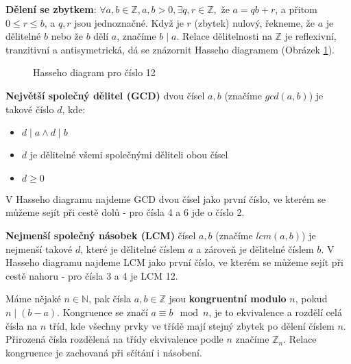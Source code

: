 \documentclass[10pt,a4paper]{article}
\begin{document}
\textbf{Dělení se zbytkem}: $\forall a, b \in \mathbb{Z}, a, b > 0, \exists q, r
\in \mathbb{Z},$ že $ a = qb + r$, a přitom $0 \leq r \le b$, a $q, r$ jsou
jednoznačné. Když je $r$ (zbytek) nulový, řekneme, že $a$ je dělitelné $b$ nebo
že $b$ dělí $a$, značíme $b \mid a$. Relace dělitelnosti na $\mathbb{Z}$ je
reflexivní, tranzitivní a antisymetrická, dá se znázornit Hasseho diagramem
(Obrázek \ref{fig:hasse}).

\begin{figure}[ht!]
\label{fig:hasse}
\centering
{}
\caption{Hasseho diagram pro číslo 12}
\end{figure}

\textbf{Největší společný dělitel (GCD)} dvou čísel $a, b$ (značíme $gcd(a,b)$)
je takové číslo $d$, kde:
\begin{itemize}
\item $d \mid a \wedge d \mid b$
\item $d$ je dělitelné všemi společnými děliteli obou čísel
\item $d \geq 0$
\end{itemize}
V Hasseho diagramu najdeme GCD dvou čísel jako první číslo, ve kterém se můžeme
sejít při cestě dolů - pro čísla 4 a 6 jde o číslo 2.

\textbf{Nejmenší společný násobek (LCM)} čísel $a, b$ (značíme $lcm(a, b)$) je
nejmenší takové $d$, které je dělitelné číslem $a$ a zároveň je dělitelné číslem
$b$. V Hasseho diagramu najdeme LCM jako první číslo, ve kterém se můžeme sejít
při cestě nahoru - pro čísla 3 a 4 je LCM 12.

Máme nějaké $n \in \mathbb{N}$, pak čísla $a, b \in \mathbb{Z}$ jsou
\textbf{kongruentní modulo} $n$, pokud $n \mid (b-a)$. Kongruence se značí $a
\equiv b\mod n$, je to ekvivalence a rozdělí celá čísla na $n$ tříd, kde všechny
prvky ve třídě mají stejný zbytek po dělení číslem $n$. Přirozená čísla
rozdělená na třídy ekvivalence podle $n$ značíme $\mathbb{Z}_n$. Relace
kongruence je zachovaná při sčítání i násobení.
\end{document}
